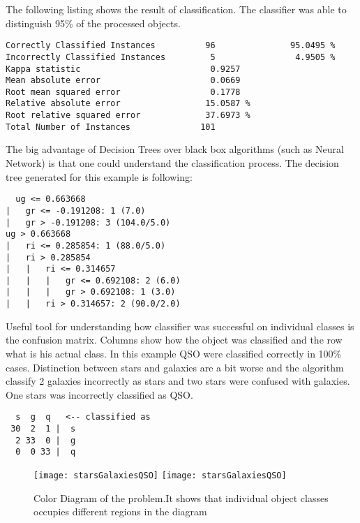 The following listing shows the result of classification. The
classifier was able to distinguish 95\% of the processed objects.



\begin{lstlisting}
Correctly Classified Instances          96               95.0495 %
Incorrectly Classified Instances         5                4.9505 %
Kappa statistic                          0.9257
Mean absolute error                      0.0669
Root mean squared error                  0.1778
Relative absolute error                 15.0587 %
Root relative squared error             37.6973 %
Total Number of Instances              101     
\end{lstlisting}

The big advantage of Decision Trees over black box algorithms (such as
Neural Network) is that one could understand the classification
process. The decision tree generated for this example is following:

\begin{lstlisting}
  ug <= 0.663668
|   gr <= -0.191208: 1 (7.0)
|   gr > -0.191208: 3 (104.0/5.0)
ug > 0.663668
|   ri <= 0.285854: 1 (88.0/5.0)
|   ri > 0.285854
|   |   ri <= 0.314657
|   |   |   gr <= 0.692108: 2 (6.0)
|   |   |   gr > 0.692108: 1 (3.0)
|   |   ri > 0.314657: 2 (90.0/2.0)
\end{lstlisting}

Useful tool for understanding how classifier was successful on
individual classes is the confusion matrix. Columns show how the
object was classified and the row what is his actual class. In this
example QSO were classified correctly in 100\% cases. Distinction
between stars and galaxies are a bit worse and the algorithm classify
2 galaxies incorrectly as stars and two stars were confused with
galaxies. One stars was incorrectly classified as QSO.
 
\begin{lstlisting}
  s  g  q   <-- classified as
 30  2  1 |  s 
  2 33  0 |  g 
  0  0 33 |  q 
\end{lstlisting}
 
\begin{figure}[!htbp]
        \leavevmode
        \ifpdf
        \texttt{[image: starsGalaxiesQSO]}
        \else
        \texttt{[image: starsGalaxiesQSO]}
        \fi
        \caption{Color Diagram of the problem.It shows that individual
          object classes occupies different regions in the diagram }
        \label{FigStarsGalaxiesQSO}
\end{figure}

